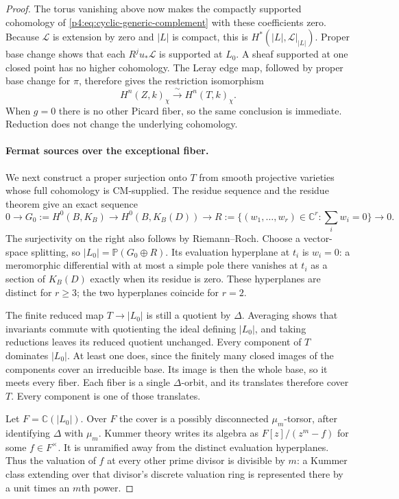 \documentclass[11pt]{article}
\newcommand{\C}{\mathbb C}
\theoremstyle{plain}
\theoremstyle{definition}
\theoremstyle{remark}
\numberwithin{equation}{section}
\begin{document}
\begin{proof}
The torus vanishing above now makes the compactly supported
cohomology of \eqref{p4:eq:cyclic-generic-complement} with
these coefficients zero.  Because $\mathcal L$ is extension
by zero and $|L|$ is compact, this is
$H^*(|L|,\mathcal L|_{|L|})$.  Proper base change shows that
each $R^j u_*\mathcal L$ is supported at $L_0$.  A sheaf
supported at one closed point has no higher cohomology.
The Leray edge map, followed by proper base change for $\pi$,
therefore gives the restriction isomorphism
\begin{equation}
 \label{p4:eq:cyclic-exceptional-restriction}
 H^n(Z,k)_\chi\xrightarrow{\;\sim\;}H^n(T,k)_\chi.
\end{equation}
When $g=0$ there is no other Picard fiber, so the same
conclusion is immediate.  Reduction does not change the
underlying cohomology.

\paragraph{Fermat sources over the exceptional fiber.}
We next construct a proper surjection onto $T$ from smooth
projective varieties whose full cohomology is CM-supplied.
The residue sequence and the residue theorem give an exact
sequence
\[
 0\longrightarrow G_0:=H^0(B,K_B)
 \longrightarrow H^0(B,K_B(D))
 \longrightarrow
 R:=\{(w_1,\ldots,w_r)\in\C^r:\textstyle\sum_iw_i=0\}
 \longrightarrow0 .
\]
The surjectivity on the right also follows by Riemann--Roch.
Choose a vector-space splitting, so
$|L_0|=\mathbb P(G_0\oplus R)$.  Its evaluation hyperplane
at $t_i$ is $w_i=0$: a meromorphic differential with at most
a simple pole there vanishes at $t_i$ as a section of $K_B(D)$
exactly when its residue is zero.  These hyperplanes are
distinct for $r\ge3$; the two hyperplanes coincide for $r=2$.

The finite reduced map $T\to|L_0|$ is still a quotient by
$\Delta$.  Averaging shows that invariants commute with
quotienting the ideal defining $|L_0|$, and taking reductions
leaves its reduced quotient unchanged.  Every component of
$T$ dominates $|L_0|$.  At least one does, since the finitely
many closed images of the components cover an irreducible base.
Its image is then the whole base, so it meets every fiber.
Each fiber is a single $\Delta$-orbit, and its translates
therefore cover $T$.  Every component is one of those translates.

Let $F=\C(|L_0|)$.  Over $F$ the cover is a possibly disconnected
$\mu_m$-torsor, after identifying $\Delta$ with $\mu_m$.
Kummer theory writes its algebra as $F[z]/(z^m-f)$ for some
$f\in F^\times$.  It is unramified away from the distinct
evaluation hyperplanes.  Thus the valuation of $f$ at every
other prime divisor is divisible by $m$: a Kummer class extending
over that divisor's discrete valuation ring is represented there
by a unit times an $m$th power.


\end{proof}
\end{document}
